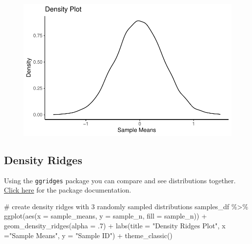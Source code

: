 \documentclass[
  letterpaper,
  DIV=11,
  numbers=noendperiod]{scrreprt}
\newenvironment{Shaded}{\begin{snugshade}}{\end{snugshade}}
\newcommand{\AttributeTok}[1]{\textcolor[rgb]{0.40,0.45,0.13}{#1}}
\newcommand{\CommentTok}[1]{\textcolor[rgb]{0.37,0.37,0.37}{#1}}
\newcommand{\DecValTok}[1]{\textcolor[rgb]{0.68,0.00,0.00}{#1}}
\newcommand{\FunctionTok}[1]{\textcolor[rgb]{0.28,0.35,0.67}{#1}}
\newcommand{\NormalTok}[1]{\textcolor[rgb]{0.00,0.23,0.31}{#1}}
\newcommand{\SpecialCharTok}[1]{\textcolor[rgb]{0.37,0.37,0.37}{#1}}
\newcommand{\StringTok}[1]{\textcolor[rgb]{0.13,0.47,0.30}{#1}}
\begin{document}
\begin{figure}[H]

{\centering \includegraphics{./visualizing-data_files/figure-pdf/unnamed-chunk-1-1.pdf}

}

\end{figure}

\hypertarget{density-ridges}{%
\subsection{Density Ridges}\label{density-ridges}}

Using the \texttt{ggridges} package you can compare and see
distributions together.
\href{https://rdocumentation.org/packages/ggridges/versions/0.5.3}{Click
here} for the package documentation.

\begin{Shaded}
\begin{Highlighting}[]
\CommentTok{\# create density ridges with 3 randomly sampled distributions }
\NormalTok{samples\_df }\SpecialCharTok{\%\textgreater{}\%}
  \FunctionTok{ggplot}\NormalTok{(}\FunctionTok{aes}\NormalTok{(}\AttributeTok{x =}\NormalTok{ sample\_means, }\AttributeTok{y =}\NormalTok{ sample\_n, }\AttributeTok{fill =}\NormalTok{ sample\_n)) }\SpecialCharTok{+}
  \FunctionTok{geom\_density\_ridges}\NormalTok{(}\AttributeTok{alpha =}\NormalTok{ .}\DecValTok{7}\NormalTok{) }\SpecialCharTok{+} 
  \FunctionTok{labs}\NormalTok{(}\AttributeTok{title =} \StringTok{"Density Ridges Plot"}\NormalTok{, }\AttributeTok{x =}\StringTok{"Sample Means"}\NormalTok{, }\AttributeTok{y =} \StringTok{"Sample ID"}\NormalTok{) }\SpecialCharTok{+}
  \FunctionTok{theme\_classic}\NormalTok{()}
\end{Highlighting}
\end{Shaded}
\end{document}
